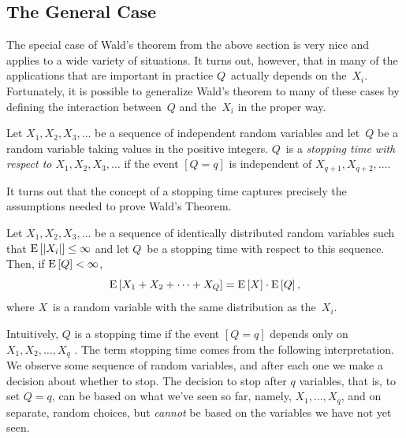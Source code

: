 \documentclass[11pt,twoside]{article}
\begin{document}
\subsection{The General Case}

The special case of Wald's theorem from the above section is very nice
and applies to a wide variety of situations.  It turns out, however,
that in many of the applications that are important in practice
$Q$~actually depends on the~$X_i$.  Fortunately, it is possible to
generalize Wald's theorem to many of these cases by defining the
interaction between~$Q$ and the~$X_i$ in the proper way.
\begin{definition}
  Let $X_1, X_2, X_3, \ldots$ be a sequence of independent random
  variables and let~$Q$ be a random variable taking values in the
  positive integers.  $Q$~is a \emph{stopping time with respect to
    $X_1, X_2, X_3, \dots$} if the event $[Q = q]$ is independent
  of $X_{q+1}, X_{q+2}, \dots$.
\end{definition}
It turns out that the concept of a stopping time captures precisely
the assumptions needed to prove Wald's Theorem.
\begin{theorem}
  Let $X_1, X_2, X_3, \ldots$ be a sequence of identically distributed
  random variables such that $\mathop{\textup{E}}\nolimits\left[\left|X_i\right|\right] \leq \infty$ and let $Q$~be a
  stopping time with respect to this sequence. Then, if $\mathop{\textup{E}}\nolimits\left[Q\right] <
  \infty$,
  \begin{displaymath}
    \mathop{\textup{E}}\nolimits\left[X_1 + X_2 + \cdots + X_Q\right] = \mathop{\textup{E}}\nolimits\left[X\right] \cdot \mathop{\textup{E}}\nolimits\left[Q\right],
  \end{displaymath}
  where $X$~is a random variable with the same distribution as
  the~$X_i$.
\end{theorem}
Intuitively, $Q$ is a stopping time if the event $[Q = q]$ depends
only on $X_1, X_2, \ldots, X_q$ .  The term stopping time comes from
the following interpretation.  We observe some sequence of random
variables, and after each one we make a decision about whether to
stop.  The decision to stop after $q$ variables, that is, to set $Q=q$,
can be based on what we've seen so far, namely, $X_1,\dots,X_q$, and on
separate, random choices, but \emph{cannot} be based on the variables
we have not yet seen.
\end{document}
